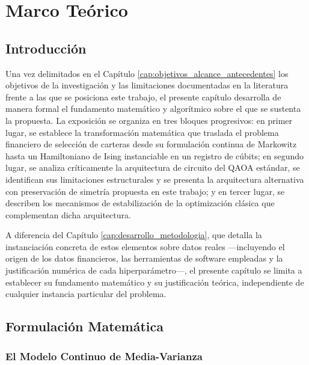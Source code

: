 \chapter{Marco Teórico}
\label{ch:marco_teorico}

\section{Introducción}
\label{sec:intro_marco_teorico}

Una vez delimitados en el Capítulo \ref{cap:objetivos_alcance_antecedentes} los objetivos de la investigación y las limitaciones documentadas en la literatura frente a las que se posiciona este trabajo, el presente capítulo desarrolla de manera formal el fundamento matemático y algorítmico sobre el que se sustenta la propuesta. La exposición se organiza en tres bloques progresivos: en primer lugar, se establece la transformación matemática que traslada el problema financiero de selección de carteras desde su formulación continua de Markowitz hasta un Hamiltoniano de Ising instanciable en un registro de cúbits; en segundo lugar, se analiza críticamente la arquitectura de circuito del QAOA estándar, se identifican sus limitaciones estructurales y se presenta la arquitectura alternativa con preservación de simetría propuesta en este trabajo; y en tercer lugar, se describen los mecanismos de estabilización de la optimización clásica que complementan dicha arquitectura.

A diferencia del Capítulo \ref{cap:desarrollo_metodologia}, que detalla la instanciación concreta de estos elementos sobre datos reales —incluyendo el origen de los datos financieros, las herramientas de software empleadas y la justificación numérica de cada hiperparámetro—, el presente capítulo se limita a establecer su fundamento matemático y su justificación teórica, independiente de cualquier instancia particular del problema.

\section{Formulación Matemática}
\label{sec:formulacion_matematica}

\subsection{El Modelo Continuo de Media-Varianza}
\label{subsec:modelo_media_varianza}

